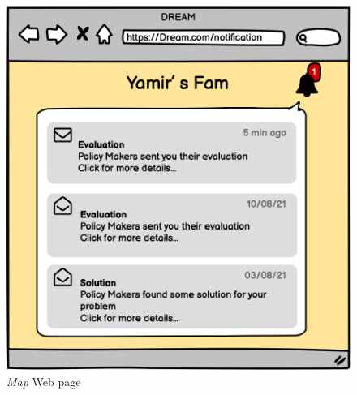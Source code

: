 \begin{figure}[H]
\begin{minipage}{0.39\textwidth}
        \includegraphics[width=1\textwidth]{images/mockups/FNotifications.png}
        \caption{\emph{Map} Web page}
        \label{fig:farmnotif}
    \end{minipage}
\end{figure}

